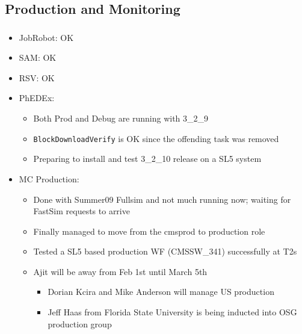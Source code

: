 \documentclass{beamer}
\begin{document}
\subsection{Production and Monitoring}
\begin{frame}
\frametitle{}

\begin{itemize}
	\item JobRobot: OK
	\item SAM: OK
	\item RSV: OK
	\item PhEDEx:
	\begin{itemize}
		\item Both Prod and Debug are running with 3\_2\_9
		\item {\tt BlockDownloadVerify} is OK since the offending task was removed
		\item Preparing to install and test 3\_2\_10 release on a SL5 system
	\end{itemize}
	\item MC Production:
	\begin{itemize}
		\item Done with Summer09 Fullsim and not much running now; waiting for FastSim requests to arrive
		\item Finally managed to move from the cmsprod to production role
		\item Tested a SL5 based production WF (CMSSW\_341) successfully at T2s
		\item Ajit will be away from Feb 1st until March 5th
		\begin{itemize}
			\item Dorian Kcira and Mike Anderson will manage US production
			\item Jeff Haas from Florida State University is being inducted into OSG production group
		\end{itemize}
	\end{itemize}
\end{itemize}
\end{frame}
\end{document}
